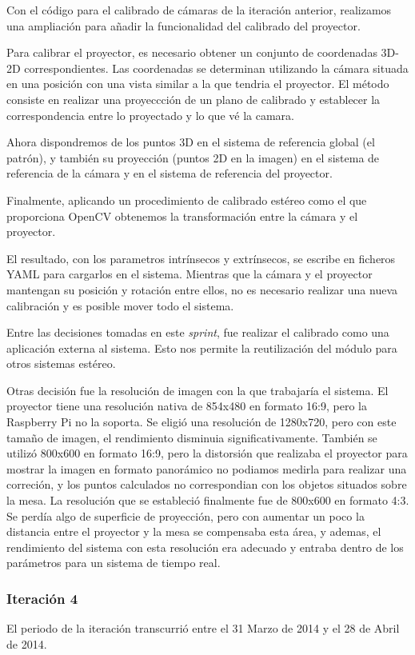 Con el código para el calibrado de cámaras de la iteración anterior, realizamos una ampliación para añadir la funcionalidad del calibrado del proyector.

Para calibrar el proyector, es necesario obtener un conjunto de coordenadas 3D-2D correspondientes. Las coordenadas se determinan utilizando la cámara situada en una posición con una vista similar a la que tendria el proyector. El método consiste en realizar una proyeccción de un plano de calibrado y establecer la correspondencia entre lo proyectado y lo que vé la camara.
 
Ahora dispondremos de los puntos 3D en el sistema de referencia global (el patrón), y también su proyección (puntos 2D en la imagen) en el sistema de referencia de la cámara y en el sistema de referencia del proyector. 

Finalmente, aplicando un procedimiento de calibrado estéreo como el que proporciona OpenCV obtenemos la transformación entre la cámara y el proyector.

El resultado, con los parametros intrínsecos y extrínsecos, se escribe en ficheros YAML para cargarlos en el sistema. Mientras que la cámara y el proyector mantengan su posición y rotación entre ellos, no es necesario realizar una nueva calibración y es posible mover todo el sistema.  

Entre las decisiones tomadas en este \textit{sprint}, fue realizar el calibrado como una aplicación externa al sistema. Esto nos permite la reutilización del módulo para otros sistemas estéreo.

Otras decisión fue la resolución de imagen con la que trabajaría el sistema. El proyector tiene una resolución nativa de 854x480 en formato 16:9, pero la Raspberry Pi no la soporta. Se eligió una resolución de 1280x720, pero con este tamaño de imagen, el rendimiento disminuia significativamente. También se utilizó 800x600 en formato 16:9, pero la distorsión que realizaba el proyector para mostrar la imagen en formato panorámico no podiamos medirla para realizar una correción, y los puntos calculados no correspondian con los objetos situados sobre la mesa.
La resolución que se estableció finalmente fue de 800x600 en formato 4:3. Se perdía algo de superficie de proyección, pero con aumentar un poco la distancia entre el proyector y la mesa se compensaba esta área, y ademas, el rendimiento del sistema con esta resolución era adecuado y entraba dentro de los parámetros para un sistema de tiempo real.

\subsubsection{Iteración 4}
El periodo de la iteración transcurrió entre el 31 Marzo de 2014 y el 28 de Abril de 2014. 

